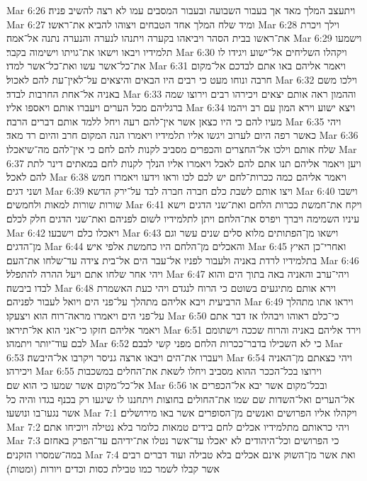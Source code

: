 Mar 6:26  ויתעצב המלך מאד אך בעבור השבועה ובעבור המסבים עמו לא רצה להשיב פניה׃
Mar 6:27  ומיד שלח המלך אחד הטבחים ויצוהו להביא את־ראשו׃
Mar 6:28  וילך ויכרת את־ראשו בבית הסהר ויביאהו בקערה ויתנהו לנערה והנערה נתנה אל־אמה׃
Mar 6:29  וישמעו תלמידיו ויבאו וישאו את־גויתו וישימוה בקבר׃
Mar 6:30  ויקהלו השליחים אל־ישוע ויגידו לו את־כל־אשר עשו ואת־כל־אשר למדו׃
Mar 6:31  ויאמר אליהם באו אתם לבדכם אל־מקום חרבה ונוחו מעט כי רבים היו הבאים והיצאים על־לאין־עת להם לאכול׃
Mar 6:32  וילכו משם באניה אל־אחת החרבות לבדד׃
Mar 6:33  וההמון ראה אותם יצאים ויכירהו רבים וירוצו שמה ברגליהם מכל הערים ויעברו אותם ויאספו אליו׃
Mar 6:34  ויצא ישוע וירא המון עם רב ויהמו מעיו להם כי היו כצאן אשר אין־להם רעה ויחל ללמד אותם דברים הרבה׃
Mar 6:35  ויהי כאשר רפה היום לערוב ויגשו אליו תלמידיו ויאמרו הנה המקום חרב והיום רד מאד׃
Mar 6:36  שלח אותם וילכו אל־החצרים והכפרים מסביב לקנות להם לחם כי אין־להם מה־שיאכלו׃
Mar 6:37  ויען ויאמר אליהם תנו אתם להם לאכל ויאמרו אליו הנלך לקנות לחם במאתים דינר לתת להם לאכל׃
Mar 6:38  ויאמר אליהם כמה ככרות־לחם יש לכם לכו וראו וידעו ויאמרו חמש ושני דגים׃
Mar 6:39  ויצו אותם לשבת כלם חברה חברה לבד על־ירק הדשא׃
Mar 6:40  וישבו שורות שורות למאות ולחמשים׃
Mar 6:41  ויקח את־חמשת ככרות הלחם ואת־שני הדגים וישא עיניו השמימה ויברך ויפרס את־הלחם ויתן לתלמידיו לשום לפניהם ואת־שני הדגים חלק לכלם׃
Mar 6:42  ויאכלו כלם וישבעו׃
Mar 6:43  וישאו מן־הפתותים מלוא סלים שנים עשר וגם מן־הדגים׃
Mar 6:44  והאכלים מן־הלחם היו כחמשת אלפי איש׃
Mar 6:45  ואחרי־כן האיץ בתלמידיו לרדת באניה ולעבור לפניו אל־עבר הים אל־בית צידה עד־שלחו את־העם׃
Mar 6:46  ויהי אחר שלחו אתם ויעל ההרה להתפלל׃
Mar 6:47  ויהי־ערב והאניה באה בתוך הים והוא לבדו ביבשה׃
Mar 6:48  וירא אותם מתיגעים בשוטם כי הרוח לנגדם ויהי כעת האשמרת הרביעית ויבא אליהם מתהלך על־פני הים ויואל לעבור לפניהם׃
Mar 6:49  ויראו אתו מתהלך על־פני הים ויאמרו מראה־רוח הוא ויצעקו׃
Mar 6:50  כי־כלם ראוהו ויבהלו אז דבר אתם ויאמר אליהם חזקו כי־אני הוא אל־תיראו׃
Mar 6:51  וירד אליהם באניה והרוח שככה וישתומם לבם עוד־יותר ויתמהו׃
Mar 6:52  כי לא השכילו בדבר־ככרות הלחם מפני קשי לבבם׃
Mar 6:53  ויעברו את־הים ויבאו ארצה גניסר ויקרבו אל־היבשה׃
Mar 6:54  ויהי כצאתם מן־האניה ויכירהו׃
Mar 6:55  וירוצו בכל־הככר ההוא מסביב ויחלו לשאת את־החלים במשכבות אל־כל־מקום אשר שמעו כי הוא שם׃
Mar 6:56  ובכל־מקום אשר יבא אל־הכפרים או אל־הערים ואל־השדות שם שמו את־החולים בחוצות ויתחננו לו שיגעו רק בכנף בגדו והיה כל אשר נגעו־בו ונושעו׃
Mar 7:1  ויקהלו אליו הפרושים ואנשים מן־הסופרים אשר באו מירושלים׃
Mar 7:2  ויהי כראותם מתלמידיו אכלים לחם בידים טמאות כלומר בלא נטילה ויוכיחו אתם׃
Mar 7:3  כי הפרושים וכל־היהודים לא יאכלו עד־אשר נטלו את־ידיהם עד־הפרק באחזם במה־שמסרו הזקנים׃
Mar 7:4  ואת אשר מן־השוק אינם אכלים בלא טבילה ועוד דברים רבים אשר קבלו לשמר כמו טבילת כסות וכדים ויורות (ומטות)׃
